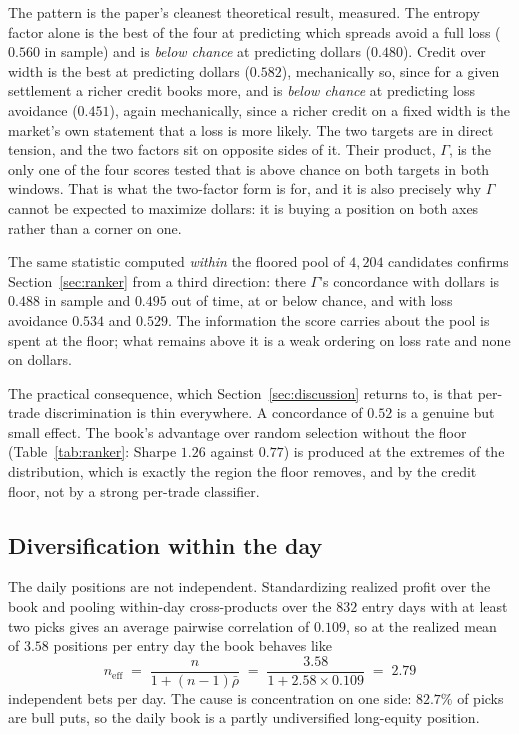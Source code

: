 \documentclass[11pt]{article}
\begin{document}
The pattern is the paper's cleanest theoretical result, measured. The entropy
factor alone is the best of the four at predicting which spreads avoid a full
loss ($0.560$ in sample) and is \emph{below chance} at predicting dollars
($0.480$). Credit over width is the best at predicting dollars ($0.582$),
mechanically so, since for a given settlement a richer credit books more, and
is \emph{below chance} at predicting loss avoidance ($0.451$), again
mechanically, since a richer credit on a fixed width is the market's own
statement that a loss is more likely. The two targets are in direct tension,
and the two factors sit on opposite sides of it. Their product, $\Gamma$, is
the only one of the four scores tested that is above chance on both targets in
both windows. That is what the two-factor form is for, and it is also precisely
why $\Gamma$ cannot be expected to maximize dollars: it is buying a position on
both axes rather than a corner on one.

The same statistic computed \emph{within} the floored pool of $4{,}204$
candidates confirms Section~\ref{sec:ranker} from a third direction: there
$\Gamma$'s concordance with dollars is $0.488$ in sample and $0.495$ out of
time, at or below chance, and with loss avoidance $0.534$ and $0.529$. The
information the score carries about the pool is spent at the floor; what
remains above it is a weak ordering on loss rate and none on dollars.

The practical consequence, which Section~\ref{sec:discussion} returns to, is
that per-trade discrimination is thin everywhere. A concordance of $0.52$ is a
genuine but small effect. The book's advantage over random selection without
the floor (Table~\ref{tab:ranker}: Sharpe $1.26$ against $0.77$) is produced at
the extremes of the distribution, which is exactly the region the floor
removes, and by the credit floor, not by a strong per-trade classifier.

\subsection{Diversification within the day}
\label{sec:diversification}

The daily positions are not independent. Standardizing realized profit over the
book and pooling within-day cross-products over the $832$ entry days with at
least two picks gives an average pairwise correlation of $0.109$, so at the
realized mean of $3.58$ positions per entry day the book behaves like
\begin{equation}
n_{\mathrm{eff}} \;=\; \frac{n}{1 + (n-1)\bar\rho} \;=\;
\frac{3.58}{1 + 2.58 \times 0.109} \;=\; 2.79
\label{eq:neff}
\end{equation}
independent bets per day. The cause is concentration on one side: $82.7\%$ of
picks are bull puts, so the daily book is a partly undiversified long-equity
position.
\end{document}
